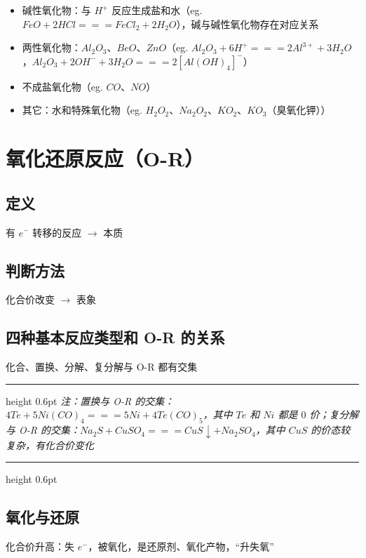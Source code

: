 \documentclass[UTF8,zihao=-4,openany]{ctexbook}
\newenvironment{notebox}
  {\par\smallskip\noindent\begingroup\begin{minipage}{\linewidth}\color{noteframe}\hrule height 0.6pt\smallskip\color{black}\itshape}
  {\par\smallskip\color{noteframe}\hrule height 0.6pt\end{minipage}\endgroup\par\smallskip}
\begin{document}
\begin{itemize}
\item 碱性氧化物：与 $H^+$ 反应生成盐和水（eg. $FeO+2HCl =\!=\!= FeCl_2+2H_2O$），碱与碱性氧化物存在对应关系
\end{itemize}

\begin{itemize}
\item 两性氧化物：$Al_2O_3$、$BeO$、$ZnO$（eg. $Al_2O_3+6H^+ =\!=\!= 2Al^{3+}+3H_2O$，$Al_2O_3+2OH^-+3H_2O=\!=\!= 2[Al(OH)_4]^-$）
\end{itemize}

\begin{itemize}
\item 不成盐氧化物（eg. $CO$、$NO$）
\end{itemize}

\begin{itemize}
\item 其它：水和特殊氧化物（eg. $H_2O_2$、$Na_2O_2$、$KO_2$、$KO_3$（臭氧化钾））
\end{itemize}

\section{氧化还原反应（O-R）}
\subsection{定义}
有 $e^-$ 转移的反应 $\to$ 本质\par

\subsection{判断方法}
化合价改变 $\to$ 表象\par

\subsection{四种基本反应类型和 O-R 的关系}
化合、置换、分解、复分解与 O-R 都有交集\par

\begin{notebox}
注：置换与 O-R 的交集：$4Te+5Ni(CO)_4 =\!=\!= 5Ni+ 4Te(CO)_5$，其中 $Te$ 和 $Ni$ 都是 $0$ 价；复分解与 O-R 的交集：$Na_2S+CuSO_4 =\!=\!= CuS\downarrow +Na_2SO_4$，其中 $CuS$ 的价态较复杂，有化合价变化\par
\end{notebox}
\subsection{氧化与还原}
化合价升高：失 $e^-$，被氧化，是还原剂、氧化产物，“升失氧”\par
\end{document}
